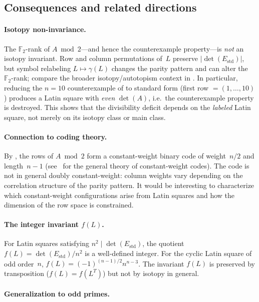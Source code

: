 \documentclass[11pt,a4paper]{article}
\newcommand{\FF}{\mathbb{F}}
\newcommand{\Estd}{E_{\mathrm{std}}}
\begin{document}
\subsection{Consequences and related directions}

\paragraph{Isotopy non-invariance.}

The $\FF_2$-rank of $A\bmod 2$---and hence the counterexample
property---is \emph{not} an isotopy invariant.  Row and column
permutations of~$L$ preserve $|\det(\Estd)|$, but symbol relabeling
$L\mapsto\gamma(L)$ changes the parity pattern and can alter the
$\FF_2$-rank; compare the broader isotopy/autotopism context in
\cite{SVW12}.  In particular, reducing the $n=10$ counterexample of
 to standard form (first row $=(1,\dots,10)$) produces a
Latin square with \emph{even} $\det(A)$, i.e.\ the counterexample property
is destroyed.  This shows that the divisibility deficit depends on the
\emph{labeled} Latin square, not merely on its isotopy class or main
class.

\paragraph{Connection to coding theory.}

By , the rows of $A\bmod 2$ form
a constant-weight binary code of weight~$n/2$ and length~$n-1$
(see~\cite{MS77} for the general theory of constant-weight codes).
The code is not in general doubly constant-weight: column weights vary
depending on the correlation structure of the parity pattern.  It would be
interesting to characterize which constant-weight configurations arise
from Latin squares and how the dimension of the row space is constrained.

\paragraph{The integer invariant $f(L)$.}

For Latin squares satisfying $n^2\mid\det(\Estd)$, the quotient
$f(L)=\det(\Estd)/n^2$ is a well-defined integer.  For the cyclic Latin
square of odd order~$n$, $f(L)=(-1)^{(n-1)/2}n^{n-3}$.  The invariant
$f(L)$ is preserved by transposition ($f(L)=f(L^T)$) but not by
isotopy in general.

\paragraph{Generalization to odd primes.}\label{sec:p-adic}
\end{document}
